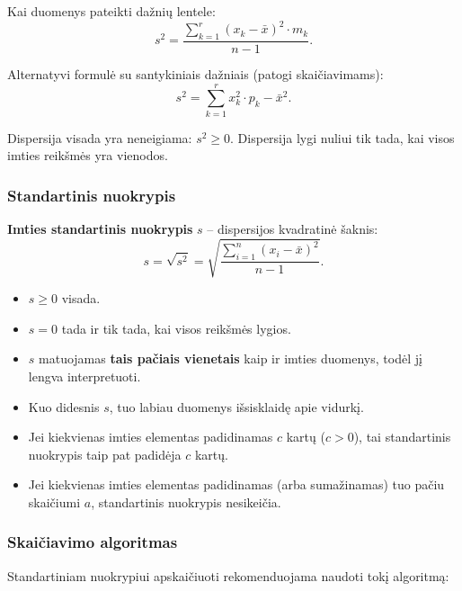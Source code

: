 Kai duomenys pateikti dažnių lentele:
\[
  s^2 = \frac{\displaystyle\sum_{k=1}^{r}(x_k - \bar{x})^2 \cdot m_k}{n-1}.
\]

Alternatyvi formulė su santykiniais dažniais (patogi skaičiavimams):
\[
  s^2 = \sum_{k=1}^{r} x_k^2 \cdot p_k - \bar{x}^2.
\]

\begin{remark}
Dispersija visada yra neneigiama: $s^2 \geq 0$. Dispersija lygi nuliui tik tada,
kai visos imties reikšmės yra vienodos.
\end{remark}

\subsubsection*{Standartinis nuokrypis}

\begin{definition}
\textbf{Imties standartinis nuokrypis} $s$ – dispersijos kvadratinė šaknis:
\[
  s = \sqrt{s^2} = \sqrt{\frac{\displaystyle\sum_{i=1}^{n}(x_i - \bar{x})^2}{n-1}}.
\]
\end{definition}

\begin{tcolorbox}[colback=green!5!white, colframe=green!60!black,
  title=Standartinio nuokrypio savybės]
\begin{itemize}
  \item $s \geq 0$ visada.
  \item $s = 0$ tada ir tik tada, kai visos reikšmės lygios.
  \item $s$ matuojamas \textbf{tais pačiais vienetais} kaip ir imties duomenys,
        todėl jį lengva interpretuoti.
  \item Kuo didesnis $s$, tuo labiau duomenys išsisklaidę apie vidurkį.
  \item Jei kiekvienas imties elementas padidinamas $c$ kartų ($c > 0$), tai
        standartinis nuokrypis taip pat padidėja $c$ kartų.
  \item Jei kiekvienas imties elementas padidinamas (arba sumažinamas) tuo pačiu
        skaičiumi $a$, standartinis nuokrypis nesikeičia.
\end{itemize}
\end{tcolorbox}

\subsubsection*{Skaičiavimo algoritmas}

Standartiniam nuokrypiui apskaičiuoti rekomenduojama naudoti tokį algoritmą:

